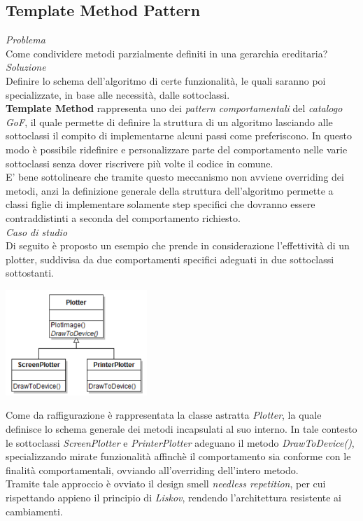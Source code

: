 \documentclass{article}
\begin{document}
\subsection*{Template Method Pattern}
\large
\textit{Problema}\\
Come condividere metodi parzialmente definiti in una gerarchia ereditaria?\vspace*{14pt}\\
\textit{Soluzione}\\
Definire lo schema dell'algoritmo di certe funzionalità, le quali saranno poi specializzate, in base alle necessità, dalle sottoclassi.\vspace*{14pt}\\
\textbf{Template Method} rappresenta uno dei \textit{pattern comportamentali} del \textit{catalogo GoF}, il quale permette di definire la struttura di un algoritmo lasciando alle sottoclassi il compito di implementarne alcuni passi come preferiscono. In questo modo è possibile ridefinire e personalizzare parte del comportamento nelle varie sottoclassi senza dover riscrivere più volte il codice in comune.\vspace*{7pt}\\
E' bene sottolineare che tramite questo meccanismo non avviene overriding dei metodi, anzi la definizione generale della struttura dell'algoritmo permette a classi figlie di implementare solamente step specifici che dovranno essere contraddistinti a seconda del comportamento richiesto.\vspace*{14pt}\\
\textit{Caso di studio}\\
Di seguito è proposto un esempio che prende in considerazione l'effettività di un plotter, suddivisa da due comportamenti specifici adeguati in due sottoclassi sottostanti.
\begin{center}
    \includegraphics[width=0.4\textwidth]{foto 5.png}
\end{center}\vspace*{7pt}
Come da raffigurazione è rappresentata la classe astratta \textit{Plotter}, la quale definisce lo schema generale dei metodi incapsulati al suo interno. In tale contesto le sottoclassi \textit{ScreenPlotter} e \textit{PrinterPlotter} adeguano il metodo \textit{DrawToDevice()}, specializzando mirate funzionalità affinchè il comportamento sia conforme con le finalità comportamentali, ovviando all'overriding dell'intero metodo.\vspace*{7pt}\\
Tramite tale approccio è ovviato il design smell \textit{needless repetition}, per cui rispettando appieno il principio di \textit{Liskov}, rendendo l'architettura resistente ai cambiamenti.
\end{document}
